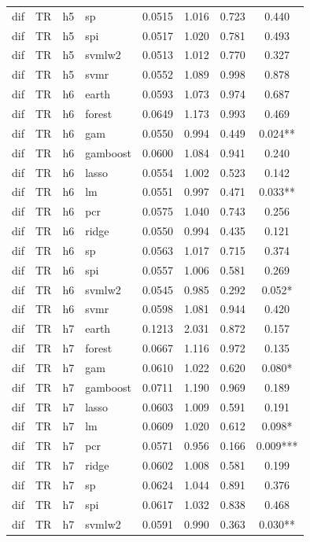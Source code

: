 \begin{ThreePartTable}
\begin{longtable}[t]{llclcccc}
dif & TR & h5 & sp & 0.0515 & 1.016 & 0.723 & 0.440\\
dif & TR & h5 & spi & 0.0517 & 1.020 & 0.781 & 0.493\\
dif & TR & h5 & svmlw2 & 0.0513 & 1.012 & 0.770 & 0.327\\
dif & TR & h5 & svmr & 0.0552 & 1.089 & 0.998 & 0.878\\
\addlinespace
dif & TR & h6 & earth & 0.0593 & 1.073 & 0.974 & 0.687\\
dif & TR & h6 & forest & 0.0649 & 1.173 & 0.993 & 0.469\\
dif & TR & h6 & gam & 0.0550 & 0.994 & 0.449 & 0.024**\\
dif & TR & h6 & gamboost & 0.0600 & 1.084 & 0.941 & 0.240\\
dif & TR & h6 & lasso & 0.0554 & 1.002 & 0.523 & 0.142\\
dif & TR & h6 & lm & 0.0551 & 0.997 & 0.471 & 0.033**\\
dif & TR & h6 & pcr & 0.0575 & 1.040 & 0.743 & 0.256\\
dif & TR & h6 & ridge & 0.0550 & 0.994 & 0.435 & 0.121\\
dif & TR & h6 & sp & 0.0563 & 1.017 & 0.715 & 0.374\\
dif & TR & h6 & spi & 0.0557 & 1.006 & 0.581 & 0.269\\
dif & TR & h6 & svmlw2 & 0.0545 & 0.985 & 0.292 & 0.052*\\
dif & TR & h6 & svmr & 0.0598 & 1.081 & 0.944 & 0.420\\
\addlinespace
dif & TR & h7 & earth & 0.1213 & 2.031 & 0.872 & 0.157\\
dif & TR & h7 & forest & 0.0667 & 1.116 & 0.972 & 0.135\\
dif & TR & h7 & gam & 0.0610 & 1.022 & 0.620 & 0.080*\\
dif & TR & h7 & gamboost & 0.0711 & 1.190 & 0.969 & 0.189\\
dif & TR & h7 & lasso & 0.0603 & 1.009 & 0.591 & 0.191\\
dif & TR & h7 & lm & 0.0609 & 1.020 & 0.612 & 0.098*\\
dif & TR & h7 & pcr & 0.0571 & 0.956 & 0.166 & 0.009***\\
dif & TR & h7 & ridge & 0.0602 & 1.008 & 0.581 & 0.199\\
dif & TR & h7 & sp & 0.0624 & 1.044 & 0.891 & 0.376\\
dif & TR & h7 & spi & 0.0617 & 1.032 & 0.838 & 0.468\\
dif & TR & h7 & svmlw2 & 0.0591 & 0.990 & 0.363 & 0.030**\\

\end{longtable}
\end{ThreePartTable}
